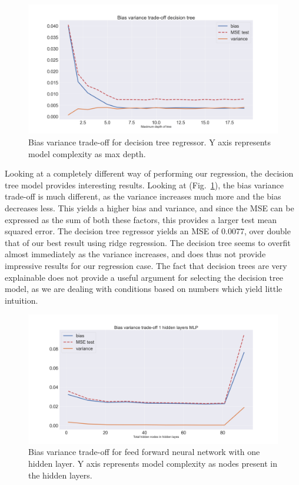 \documentclass[onecolumn,10pt,cleanfoot]{asme2ej}
\begin{document}
\begin{figure}[H]
\centerline{\includegraphics[width=5in]{figs/BV_Decison_tree.png}}
\caption{Bias variance trade-off for decision tree regressor. Y axis represents model complexity as max depth.}
\label{tree}
\end{figure}

Looking at a completely different way of performing our regression, the decision tree model provides interesting results. Looking at (Fig.~\ref{tree}), the bias variance trade-off is much different, as the variance increases much more and the bias decreases less. This yields a higher bias and variance, and since the MSE can be expressed as the sum of both these factors, this provides a larger test mean squared error. The decision tree regressor yields an MSE of 0.0077, over double that of our best result using ridge regression. The decision tree seems to overfit almost immediately as the variance increases, and does thus not provide impressive results for our regression case. The fact that decision trees are very explainable does not provide a useful argument for selecting the decision tree model, as we are dealing with conditions based on numbers which yield little intuition.

\begin{figure}[H]
\centerline{\includegraphics[width=5in]{figs/BV_ffnn1.png}}
\caption{Bias variance trade-off for feed forward neural network with one hidden layer. Y axis represents model complexity as nodes present in the hidden layers.}
\label{ffnn1}
\end{figure}
\end{document}
